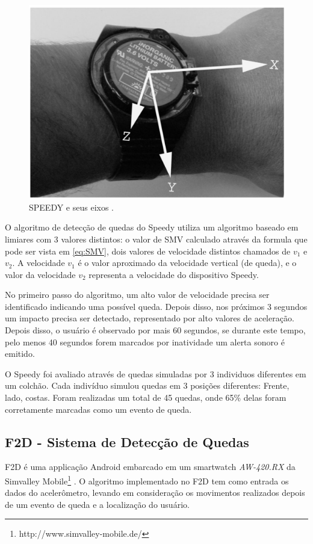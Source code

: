 \begin{figure}[ht]
	\centering
	\includegraphics[scale=0.5]{imagens/speedy.png}
	\caption{ SPEEDY e seus eixos \cite{degen2003speedy}.}
	\label{fig:speedy}
\end{figure} 

O algoritmo de detecção de quedas do Speedy utiliza um algoritmo baseado em limiares com 3 valores distintos: o valor de \ac{SMV} calculado através da formula que pode ser vista em \ref{eq:SMV}, dois valores de velocidade distintos chamados de $v_1$ e $v_2$. A velocidade $v_1$ é o valor aproximado da velocidade vertical (de queda), e o valor da velocidade $v_2$ representa a velocidade do dispositivo Speedy. 

No primeiro passo do algoritmo, um alto valor de velocidade precisa ser identificado indicando uma possível queda. Depois disso, nos próximos 3 segundos um impacto precisa ser detectado, representado por alto valores de aceleração. Depois disso, o usuário é observado por mais 60 segundos, se durante este tempo, pelo menos 40 segundos forem marcados por inatividade um alerta sonoro é emitido. 

O Speedy foi avaliado através de quedas simuladas por 3 individuos diferentes em um colchão. Cada indivíduo simulou  quedas em 3 posições diferentes: Frente, lado, costas. Foram realizadas um total de 45 quedas, onde 65\% delas foram corretamente marcadas como um evento de queda. 

\subsection{F2D - Sistema de Detecção de Quedas}
\label{subsec:F2D_System}
F2D é uma applicação Android embarcado em um smartwatch \textit{AW-420.RX} da Simvalley Mobile\footnote{http://www.simvalley-mobile.de/} \citep{kostopoulos2015f2d}. O algoritmo implementado no F2D tem como entrada os dados do acelerômetro, levando em consideração os movimentos realizados depois de um evento de queda e a localização do usuário. 


